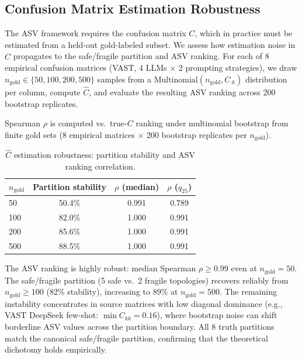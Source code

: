 \subsection{Confusion Matrix Estimation Robustness}
\label{sec:c_robustness}

The ASV framework requires the confusion matrix $C$, which in practice must be estimated from a held-out gold-labeled subset. We assess how estimation noise in $\hat{C}$ propagates to the safe/fragile partition and ASV ranking. For each of 8 empirical confusion matrices (VAST, 4 LLMs $\times$ 2 prompting strategies), we draw $n_{\text{gold}} \in \{50, 100, 200, 500\}$ samples from a $\text{Multinomial}(n_{\text{gold}}, C_{\cdot k})$ distribution per column, compute $\hat{C}$, and evaluate the resulting ASV ranking across 200 bootstrap replicates.

Spearman $\rho$ is computed vs.\ true-$C$ ranking under multinomial bootstrap from finite gold sets (8 empirical matrices $\times$ 200 bootstrap replicates per $n_{\text{gold}}$).

\begin{table}[H]
\centering
\small
\caption{$\hat{C}$ estimation robustness: partition stability and ASV ranking correlation.}
\label{tab:c_robustness}
\begin{tabular}{lccc}
\toprule
$n_{\text{gold}}$ & Partition stability & $\rho$ (median) & $\rho$ ($q_{25}$) \\
\midrule
50 & 50.4\% & 0.991 & 0.789 \\
100 & 82.0\% & 1.000 & 0.991 \\
200 & 85.6\% & 1.000 & 0.991 \\
500 & 88.5\% & 1.000 & 0.991 \\
\bottomrule
\end{tabular}
\end{table}

The ASV ranking is highly robust: median Spearman $\rho \geq 0.99$ even at $n_{\text{gold}}{=}50$. The safe/fragile partition (5 safe vs.\ 2 fragile topologies) recovers reliably from $n_{\text{gold}} \geq 100$ (82\% stability), increasing to 89\% at $n_{\text{gold}}{=}500$. The remaining instability concentrates in source matrices with low diagonal dominance (e.g., VAST DeepSeek few-shot: $\min C_{kk} = 0.16$), where bootstrap noise can shift borderline ASV values across the partition boundary. All 8 truth partitions match the canonical safe/fragile partition, confirming that the theoretical dichotomy holds empirically.

